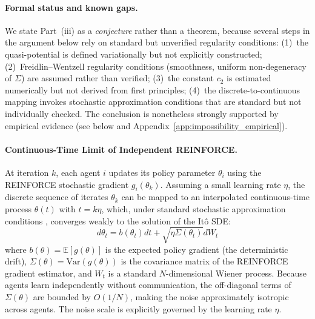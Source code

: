 \paragraph{Formal status and known gaps.}
We state Part~(iii) as a \emph{conjecture} rather than a theorem, because several steps in the argument below rely on standard but unverified regularity conditions:
(1)~the quasi-potential is defined variationally but not explicitly constructed;
(2)~Freidlin--Wentzell regularity conditions (smoothness, uniform non-degeneracy of $\Sigma$) are assumed rather than verified;
(3)~the constant $c_2$ is estimated numerically but not derived from first principles;
(4)~the discrete-to-continuous mapping invokes stochastic approximation conditions that are standard but not individually checked.
The conclusion is nonetheless strongly supported by empirical evidence (see below and Appendix~\ref{app:impossibility_empirical}).

\paragraph{Continuous-Time Limit of Independent REINFORCE.}
At iteration $k$, each agent $i$ updates its policy parameter $\theta_i$ using the REINFORCE stochastic gradient $g_i(\theta_k)$.
Assuming a small learning rate $\eta$, the discrete sequence of iterates $\theta_k$ can be mapped to an interpolated continuous-time process $\theta(t)$ with $t = k\eta$, which, under standard stochastic approximation conditions \citep{kushner2003stochastic, borkar2009stochastic}, converges weakly to the solution of the It\^o SDE:
\begin{equation}
d\theta_t = b(\theta_t) dt + \sqrt{\eta \Sigma(\theta_t)} dW_t
\label{eq:sde}
\end{equation}
where $b(\theta) = \mathbb{E}[g(\theta)]$ is the expected policy gradient (the deterministic drift), $\Sigma(\theta) = \mathrm{Var}(g(\theta))$ is the covariance matrix of the REINFORCE gradient estimator, and $W_t$ is a standard $N$-dimensional Wiener process.
Because agents learn independently without communication, the off-diagonal terms of $\Sigma(\theta)$ are bounded by $O(1/N)$, making the noise approximately isotropic across agents. The noise scale is explicitly governed by the learning rate $\eta$.

